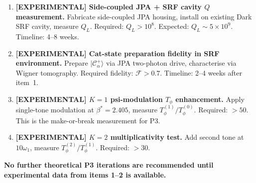 \documentclass[11pt]{article}
\theoremstyle{definition}
\theoremstyle{remark}
\newcommand{\ee}[1]{\times 10^{#1}}
\begin{document}
\begin{enumerate}

\item \textbf{[EXPERIMENTAL] Side-coupled JPA + SRF cavity $Q$
  measurement.}  Fabricate side-coupled JPA housing, install on
  existing Dark SRF cavity, measure $Q_L$.  Required: $Q_L > 10^8$.
  Expected: $Q_L \sim 5\ee{9}$.  Timeline: 4--8 weeks.

\item \textbf{[EXPERIMENTAL] Cat-state preparation fidelity in SRF
  environment.}  Prepare $|\mathcal{C}_\alpha^+\rangle$ via JPA
  two-photon drive, characterise via Wigner tomography.  Required
  fidelity: $\mathcal{F} > 0.7$.  Timeline: 2--4 weeks after item~1.

\item \textbf{[EXPERIMENTAL] $K=1$ psi-modulation $T_\phi$ enhancement.}
  Apply single-tone modulation at $\beta^* = 2.405$, measure
  $T_\phi^{(1)}/T_\phi^{(0)}$.  Required: $> 50$.  This is the
  make-or-break measurement for P3.

\item \textbf{[EXPERIMENTAL] $K=2$ multiplicativity test.}
  Add second tone at $10\omega_1$, measure
  $T_\phi^{(2)}/T_\phi^{(1)}$.  Required: $> 30$.

\end{enumerate}

\textbf{No further theoretical P3 iterations are recommended until
experimental data from items 1--2 is available.}
\end{document}
